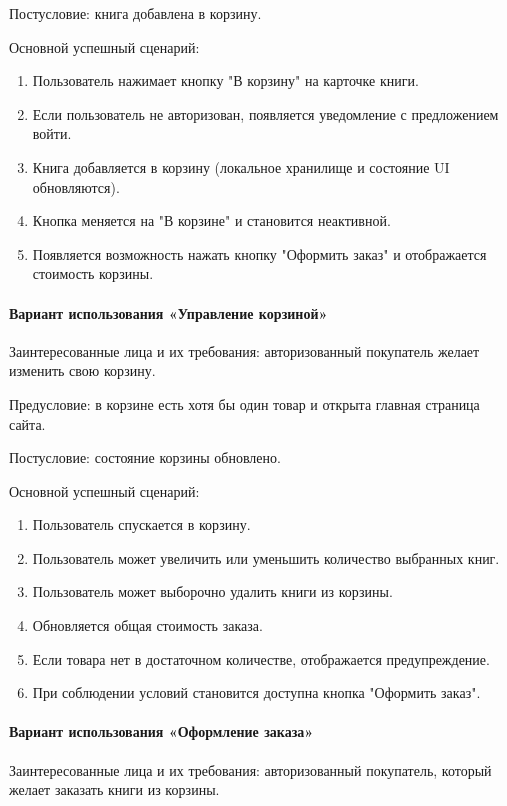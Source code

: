 Постусловие: книга добавлена в корзину.

Основной успешный сценарий:

\begin{enumerate}
	\item Пользователь нажимает кнопку "В корзину" на карточке книги.
	\item Если пользователь не авторизован, появляется уведомление с предложением войти.
	\item Книга добавляется в корзину (локальное хранилище и состояние UI обновляются).
	\item Кнопка меняется на "В корзине" и становится неактивной.
	\item Появляется возможность нажать кнопку "Оформить заказ"
	и отображается стоимость корзины.
\end{enumerate}


\paragraph{Вариант использования «Управление корзиной»}

Заинтересованные лица и их требования: авторизованный покупатель желает изменить свою корзину.

Предусловие: в корзине есть хотя бы один товар и открыта главная страница сайта.

Постусловие: состояние корзины обновлено.

Основной успешный сценарий:

\begin{enumerate}
	\item Пользователь спускается в корзину.
	\item Пользователь может увеличить или уменьшить количество выбранных книг.
	\item Пользователь может выборочно удалить книги из корзины.
	\item Обновляется общая стоимость заказа.
	\item Если товара нет в достаточном количестве, отображается предупреждение.
	\item При соблюдении условий становится доступна кнопка "Оформить заказ".
\end{enumerate}


\paragraph{Вариант использования «Оформление заказа»}

Заинтересованные лица и их требования: авторизованный покупатель, который желает заказать книги из корзины.

